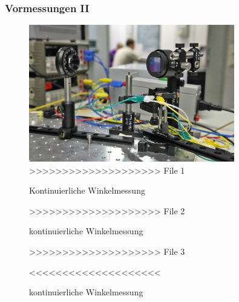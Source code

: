 \documentclass[10pt]{beamer}
\begin{document}
{
\frametitle{Vormessungen II}
\begin{figure}
\begin{center}
\includegraphics[width=0.8\textwidth]{./images/prIMG_7244bh}
>>>>>>>>>>>>>>>>>>>> File 1
\caption{Kontinuierliche Winkelmessung}
>>>>>>>>>>>>>>>>>>>> File 2
\caption{kontinuierliche Winkelmessung}
>>>>>>>>>>>>>>>>>>>> File 3
\caption{kontinuierliche Winkelmessung}
<<<<<<<<<<<<<<<<<<<<
\end{center}
\end{figure}
}
\frame
\end{document}
